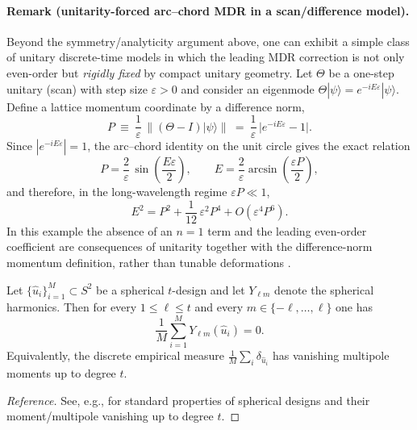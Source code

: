 \paragraph{Remark (unitarity-forced arc--chord MDR in a scan/difference model).}
Beyond the symmetry/analyticity argument above, one can exhibit a simple class of unitary discrete-time models in which the leading MDR correction is not only even-order but \emph{rigidly fixed} by compact unitary geometry.
Let $\Theta$ be a one-step unitary (scan) with step size $\varepsilon>0$ and consider an eigenmode $\Theta|\psi\rangle=e^{-iE\varepsilon}|\psi\rangle$.
Define a lattice momentum coordinate by a difference norm,
\begin{equation}
    P\ \equiv\ \frac{1}{\varepsilon}\,\|(\Theta-I)|\psi\rangle\|\ =\ \frac{1}{\varepsilon}\,\big|e^{-iE\varepsilon}-1\big|.
\end{equation}
Since $|e^{-iE\varepsilon}|=1$, the arc--chord identity on the unit circle gives the exact relation
\begin{equation}
    P=\frac{2}{\varepsilon}\,\sin\!\left(\frac{E\varepsilon}{2}\right),
    \qquad
    E=\frac{2}{\varepsilon}\arcsin\!\left(\frac{\varepsilon P}{2}\right),
\end{equation}
and therefore, in the long-wavelength regime $\varepsilon P\ll 1$,
\begin{equation}
    E^2=P^2+\frac{1}{12}\,\varepsilon^2 P^4+O(\varepsilon^4 P^6).
\end{equation}
In this example the absence of an $n=1$ term and the leading even-order coefficient are consequences of unitarity together with the difference-norm momentum definition, rather than tunable deformations \cite{Ma2025HPA}.

\begin{proposition}
\label{prop:design_suppresses_lowell}
Let $\{\hat u_i\}_{i=1}^M\subset S^2$ be a spherical $t$-design and let $Y_{\ell m}$ denote the spherical harmonics. Then for every $1\le \ell\le t$ and every $m\in\{-\ell,\dots,\ell\}$ one has
\begin{equation}
    \frac{1}{M}\sum_{i=1}^M Y_{\ell m}(\hat u_i)=0.
\end{equation}
Equivalently, the discrete empirical measure $\frac{1}{M}\sum_i \delta_{\hat u_i}$ has vanishing multipole moments up to degree $t$.
\end{proposition}
\begin{proof}[Reference]
See, e.g., \cite{DelsarteGoethalsSeidel1977} for standard properties of spherical designs and their moment/multipole vanishing up to degree $t$.
\end{proof}

